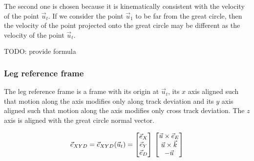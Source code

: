 The second one is chosen because it is kinematically consistent with the velocity of the point $\vec{u}_t$. If we consider the point $\vec{u}_1$ to be far from the great circle, then the velocity of the point projected onto the great circle may be different as the velocity of the point $\vec{u}_t$.

TODO: provide formula

\subsubsection{Leg reference frame}
The leg reference frame is a frame with its origin at $\vec{u}_t$, its $x$ axis aligned such that motion along the axis modifies only along track deviation and its $y$ axis aligned such that motion along the axis modifies only cross track deviation. The $z$ axis is aligned with the great circle normal vector.

\begin{equation}
    \vec{e}_{XYD} = \vec{e}_{XYD} (\vec{u}_t) =
    \left[
        \begin{matrix}
            \vec{e}_X \\
            \vec{e}_Y \\
            \vec{e}_D \\
    \end{matrix}\right] \\
    \left[
        \begin{matrix}            
            \vec{u} \times \vec{e}_E \\
			\vec{u} \times \vec{k} \\
            -\vec{u}
    \end{matrix}\right]
\end{equation}
